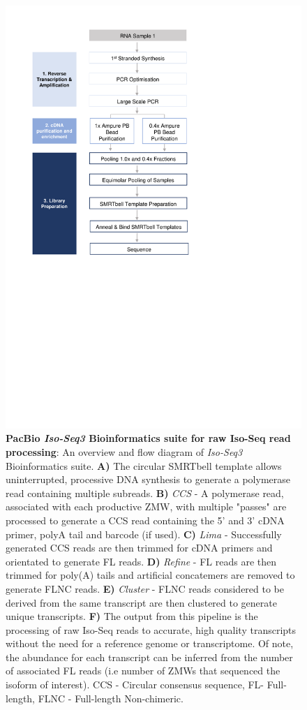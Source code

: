 \begin{figure}[htp]
	\centering
	\includegraphics[page=18,trim={0 8cm 0 0},clip,scale = 0.8]{Figures/ProjectDevelopment_Figures.pdf}
	\captionsetup{width=0.95\textwidth, singlelinecheck=off}
	\caption[PacBio \textit{Iso-Seq3} Bioinformatics suite for raw Iso-Seq read processing]%
	{\textbf{PacBio \textit{Iso-Seq3} Bioinformatics suite for raw Iso-Seq read processing}: An overview and flow diagram of \textit{Iso-Seq3} Bioinformatics suite. \textbf{A)} The circular SMRTbell template allows uninterrupted, processive DNA synthesis to generate a polymerase read containing multiple subreads. \textbf{B)} \textit{CCS} - A polymerase read, associated with each productive ZMW, with multiple "passes" are processed to generate a CCS read containing the 5' and 3' cDNA primer, polyA tail and barcode (if used). \textbf{C)} \textit{Lima} - Successfully generated CCS reads are then trimmed for cDNA primers and orientated to generate FL reads. \textbf{D)} \textit{Refine} - FL reads are then trimmed for poly(A) tails and artificial concatemers are removed to generate FLNC reads. \textbf{E)} \textit{Cluster} - FLNC reads considered to be derived from the same transcript are then clustered to generate unique transcripts. \textbf{F)} The output from this pipeline is the processing of raw Iso-Seq reads to accurate, high quality transcripts without the need for a reference genome or transcriptome. Of note, the abundance for each transcript can be inferred from the number of associated FL reads (i.e number of ZMWs that sequenced the isoform of interest). CCS - Circular consensus sequence, FL- Full-length, FLNC - Full-length Non-chimeric.}

\end{figure}
